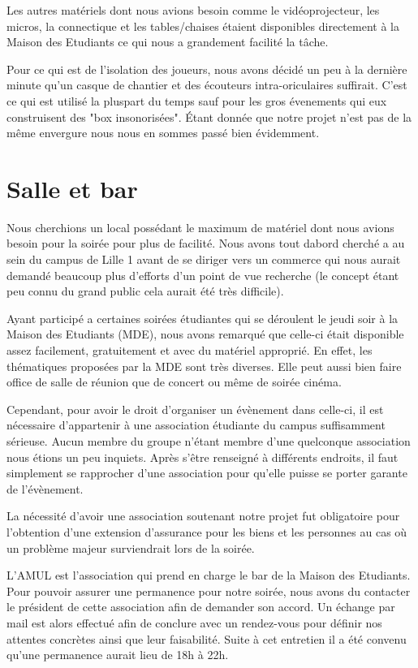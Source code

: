 Les autres matériels dont nous avions besoin comme le vidéoprojecteur,
les micros, la connectique et les tables/chaises étaient disponibles directement à
la Maison des Etudiants ce qui nous a grandement facilité la tâche.

Pour ce qui est de l'isolation des joueurs, nous avons décidé un peu à
la dernière minute qu'un casque de chantier et des écouteurs
intra-oriculaires suffirait. C'est ce qui est utilisé la pluspart du
temps sauf pour les gros évenements qui eux construisent des "box
insonorisées". Étant donnée que notre projet n'est pas de la même
envergure nous nous en sommes passé bien évidemment.

\section{Salle et bar}%
\label{sec:salle_et_bar}

Nous cherchions un local possédant le maximum de matériel dont nous
avions besoin pour la soirée pour plus de facilité. Nous avons tout
dabord cherché a au sein du campus de Lille 1 avant de se diriger vers
un commerce qui nous aurait demandé beaucoup plus d'efforts d'un point de
vue recherche (le concept étant peu connu du grand public cela aurait été
très difficile).

Ayant participé a certaines soirées étudiantes qui se déroulent le jeudi
soir à la Maison des Etudiants (MDE), nous avons remarqué que celle-ci
était disponible assez facilement, gratuitement et avec du matériel
approprié. En effet, les thématiques proposées par la MDE sont très
diverses. Elle peut aussi bien faire office de salle de réunion que de
concert ou même de soirée cinéma.

Cependant, pour avoir le droit d'organiser un évènement dans celle-ci, il est nécessaire 
d'appartenir à une association étudiante du campus suffisamment sérieuse. Aucun
membre du groupe n'étant membre d'une quelconque association nous étions un
peu inquiets. Après s'être renseigné à différents endroits, il faut
simplement se rapprocher d'une association pour qu'elle puisse se porter
garante de l'évènement.

La nécessité d'avoir une association soutenant notre projet fut obligatoire pour
l'obtention d'une extension d'assurance pour les biens et les personnes
au cas où un problème majeur surviendrait lors de la soirée.

L'AMUL est l'association qui prend en charge le bar de la Maison des
Etudiants. Pour pouvoir assurer une permanence pour notre soirée, nous
avons du contacter le président de cette association afin de demander
son accord. Un échange par mail est alors effectué afin de conclure avec
un rendez-vous pour définir nos attentes concrètes ainsi que leur faisabilité. 
Suite à cet entretien il a été convenu qu'une permanence
aurait lieu de 18h à 22h.

